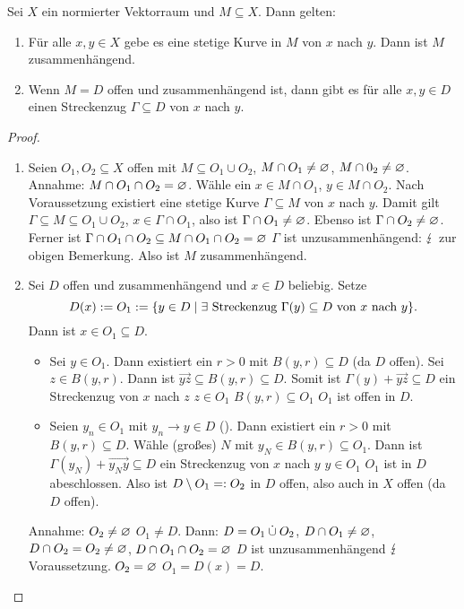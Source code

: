 \documentclass[a4paper,twoside,DIV15,BCOR12mm]{scrbook}
\begin{document}
\begin{satz} \label{satz2.8}
  Sei $X$ ein normierter Vektorraum und $M\subseteq X$. Dann gelten:
  \begin{enumerate}
  \item \label{satz2.8a} Für alle $x,y\in X$ gebe es eine stetige Kurve in $M$ von $x$ nach $y$. Dann ist $M$ zusammenhängend.
  \item \label{satz2.8b} Wenn $M=D$ offen und zusammenhängend ist, dann gibt es für alle $x,y\in D$ einen Streckenzug
    $\Gamma\subseteq D$ von $x$ nach $y$.
  \end{enumerate}
\end{satz}
\begin{proof}
  \begin{enumerate}
  \item Seien $O_1,O_2\subseteq X$ offen mit $M\subseteq O_1\cup O_2$, $M\cap O_1\neq\varnothing$, $M\cap 0_2\neq\varnothing$. Annahme: $M\cap O_1\cap
    O_2=\varnothing$. Wähle ein $x\in M\cap O_1$, $y\in M\cap O_2$. Nach Voraussetzung existiert eine stetige Kurve $\Gamma\subseteq
    M$ von $x$ nach $y$. Damit gilt $\Gamma\subseteq M\subseteq O_1\cup O_2$, $x\in\Gamma\cap O_1$, also ist $\Gamma\cap
    O_1\neq\varnothing$. Ebenso ist $\Gamma\cap O_2\neq\varnothing$. Ferner ist $\Gamma\cap O_1\cap O_2\subseteq M\cap O_1\cap O_2=\varnothing$
    \folgt $\Gamma$ ist unzusammenhängend: $\lightning$ zur obigen Bemerkung. Also ist $M$ zusammenhängend.
  \item Sei $D$ offen und zusammenhängend und $x\in D$ beliebig. Setze
    \[ D(x) := O_1 := \{ y\in D \mid \exists \text{ Streckenzug } \Gamma(y)\subseteq D \text{ von } x \text{ nach } y \}. \]
    Dann ist $x\in O_1\subseteq D$.
    \begin{itemize}
    \item Sei $y\in O_1$. Dann existiert ein $r>0$ mit $B(y,r)\subseteq D$ (da $D$ offen). Sei $z\in B(y,r)$. Dann ist
      $\overrightarrow{yz}\subseteq B(y,r)\subseteq D$. Somit ist $\Gamma(y)+\overrightarrow{yz}\subseteq D$ ein Streckenzug von
      $x$ nach $z$ \folgt $z\in O_1$ \folgt $B(y,r)\subseteq O_1$ \folgt $O_1$ ist offen in $D$.
    \item Seien $y_n\in O_1$ mit $y_n\to y\in D$ (\ninf). Dann existiert ein $r>0$ mit $B(y,r)\subseteq D$. Wähle (großes) $N$
      mit $y_N\in B(y,r)\subseteq O_1$. Dann ist $\Gamma(y_N) + \overrightarrow{y_Ny}\subseteq D$ ein Streckenzug von $x$ nach
      $y$ \folgt $y\in O_1$ \folgt $O_1$ ist in $D$ abeschlossen. Also ist $D\setminus O_1=: O_2$ in $D$ offen, also auch in
      $X$ offen (da $D$ offen).
    \end{itemize}
    Annahme: $O_2\neq\varnothing$ \gdw $O_1\neq D$. Dann: $D=O_1\mathbin{\dot{\cup}} O_2$, $D\cap O_1\neq\varnothing$, $D\cap O_2=O_2\neq\varnothing$, $D\cap
    O_1\cap O_2=\varnothing$ \folgt $D$ ist unzusammenhängend $\lightning$ Voraussetzung. \folgt $O_2=\varnothing$ \folgt $O_1=D(x)=D$. \qedhere
  \end{enumerate}
\end{proof}
\end{document}
